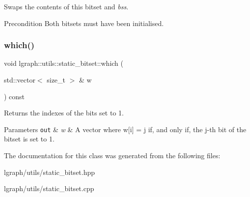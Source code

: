 Swaps the contents of this bitset and {\itshape bs\textquotesingle{}s}. 

\begin{DoxyPrecond}{Precondition}
Both bitsets must have been initialised. 
\end{DoxyPrecond}
\mbox{\label{classlgraph_1_1utils_1_1static__bitset_a05139232b7aabf6b7ca22ecd7f0a4086}} 
\subsubsection{\texorpdfstring{which()}{which()}}
{\footnotesize\ttfamily void lgraph\+::utils\+::static\+\_\+bitset\+::which (\begin{DoxyParamCaption}\item[{std\+::vector$<$ size\+\_\+t $>$ \&}]{w }\end{DoxyParamCaption}) const}



Returns the indexes of the bits set to 1. 


\begin{DoxyParams}[1]{Parameters}
\mbox{\tt out}  & {\em w} & A vector where w\mbox{[}i\mbox{]} = j if, and only if, the j-\/th bit of the bitset is set to 1. \\
\hline
\end{DoxyParams}


The documentation for this class was generated from the following files\+:\begin{DoxyCompactItemize}
\item 
lgraph/utils/static\+\_\+bitset.\+hpp\item 
lgraph/utils/static\+\_\+bitset.\+cpp\end{DoxyCompactItemize}
